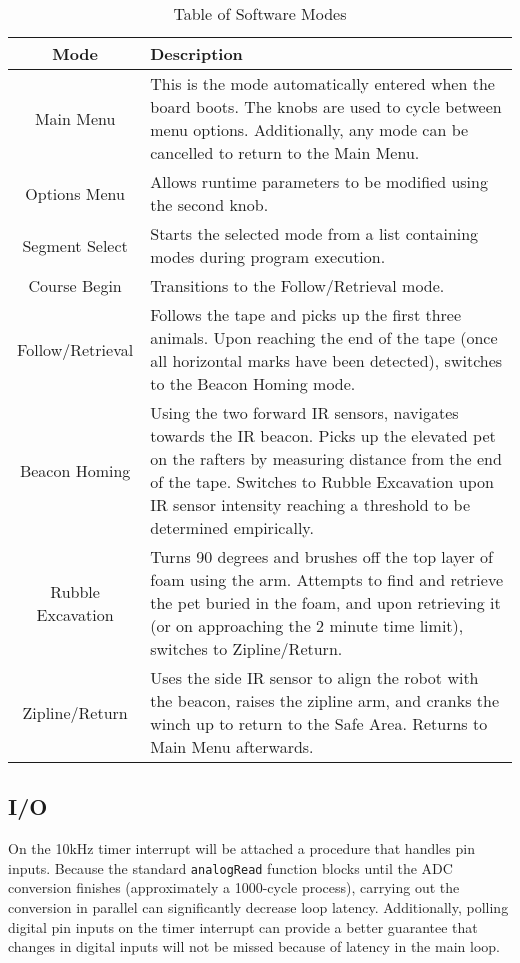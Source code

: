 \documentclass[11pt, oneside]{article} %
\begin{document}
\begin{table}
	\caption{Table of Software Modes}
	\centering
	\begin{tabular}{ | c | p{5in} | }
	\hline
	\textbf{Mode} & \textbf{Description} \\ \hline
	Main Menu & This is the mode automatically entered when the board boots. The knobs are used to cycle between menu options. Additionally, any mode can be cancelled to return to the Main Menu. \\ \hline
	Options Menu & Allows runtime parameters to be modified using the second knob. \\ \hline
	Segment Select & Starts the selected mode from a list containing modes during program execution. \\ \hline
	Course Begin & Transitions to the Follow/Retrieval mode. \\ \hline
	Follow/Retrieval & Follows the tape and picks up the first three animals. Upon reaching the end of the tape (once all horizontal marks have been detected), switches to the Beacon Homing mode. \\ \hline
	Beacon Homing & Using the two forward IR sensors, navigates towards the IR beacon. Picks up the elevated pet on the rafters by measuring distance from the end of the tape. Switches to Rubble Excavation upon IR sensor intensity reaching a threshold to be determined empirically. \\ \hline
	Rubble Excavation & Turns 90 degrees and brushes off the top layer of foam using the arm. Attempts to find and retrieve the pet buried in the foam, and upon retrieving it (or on approaching the 2 minute time limit), switches to Zipline/Return. \\ \hline
	Zipline/Return &
	Uses the side IR sensor to align the robot with the beacon, raises the zipline arm, and cranks the winch up to return to the Safe Area. Returns to Main Menu afterwards.
	\\ \hline
	\end{tabular}
	\label{table:Software Modes}
\end{table}

	\subsection{I/O}
	
	On the 10kHz timer interrupt will be attached a procedure that handles pin inputs. Because the standard \texttt{analogRead} function blocks until the ADC conversion finishes (approximately a 1000-cycle process), carrying out the conversion in parallel can significantly decrease loop latency. Additionally, polling digital pin inputs on the timer interrupt can provide a better guarantee that changes in digital inputs will not be missed because of latency in the main loop.
	
\end{document}
